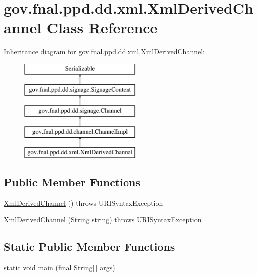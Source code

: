 \hypertarget{classgov_1_1fnal_1_1ppd_1_1dd_1_1xml_1_1XmlDerivedChannel}{\section{gov.\-fnal.\-ppd.\-dd.\-xml.\-Xml\-Derived\-Channel Class Reference}
\label{classgov_1_1fnal_1_1ppd_1_1dd_1_1xml_1_1XmlDerivedChannel}
}
Inheritance diagram for gov.\-fnal.\-ppd.\-dd.\-xml.\-Xml\-Derived\-Channel\-:\begin{figure}[H]
\begin{center}
\leavevmode
\includegraphics[height=5.000000cm]{classgov_1_1fnal_1_1ppd_1_1dd_1_1xml_1_1XmlDerivedChannel}
\end{center}
\end{figure}
\subsection*{Public Member Functions}
\begin{DoxyCompactItemize}
\item 
\hyperlink{classgov_1_1fnal_1_1ppd_1_1dd_1_1xml_1_1XmlDerivedChannel_a99604d4e33cb14128bdadbbeb26e961a}{Xml\-Derived\-Channel} ()  throws U\-R\-I\-Syntax\-Exception 
\item 
\hyperlink{classgov_1_1fnal_1_1ppd_1_1dd_1_1xml_1_1XmlDerivedChannel_a42743783587a2fcfe7ed1eebe5d04299}{Xml\-Derived\-Channel} (String string)  throws U\-R\-I\-Syntax\-Exception 
\end{DoxyCompactItemize}
\subsection*{Static Public Member Functions}
\begin{DoxyCompactItemize}
\item 
static void \hyperlink{classgov_1_1fnal_1_1ppd_1_1dd_1_1xml_1_1XmlDerivedChannel_a2c89f72f377c9a9c03cf16bef99efa8e}{main} (final String\mbox{[}$\,$\mbox{]} args)
\end{DoxyCompactItemize}
